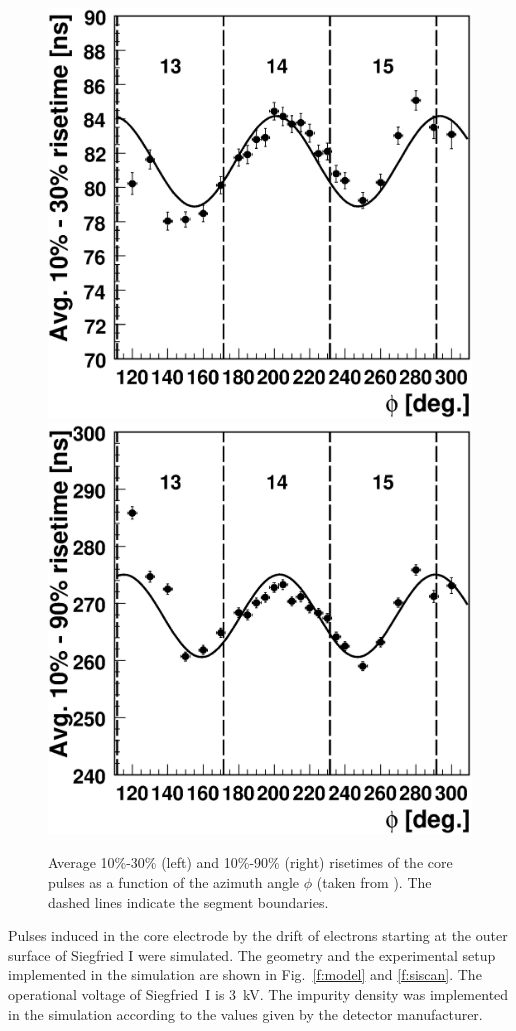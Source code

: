 \documentclass[epj]{svjour}
\begin{document}
\begin{figure}[htpb]
\centering
\includegraphics[width=0.7\linewidth]{phi_risetime1030}
\includegraphics[width=0.7\linewidth]{phi_risetime1090}
\caption{Average 10\%-30\% (left) and 10\%-90\% (right) risetimes of
the core pulses as a function of the azimuth angle $\phi$ (taken from
\cite{si}). The dashed lines indicate the segment boundaries.}
\label{f:rt10}
\end{figure}

Pulses induced in the core electrode by the drift of electrons
starting at the outer surface of Siegfried I were simulated. The
geometry and the experimental setup implemented in the simulation are
shown in Fig.~\ref{f:model} and \ref{f:siscan}. The operational
voltage of Siegfried~I is 3~kV. The impurity density was implemented
in the simulation according to the values given by the detector
manufacturer.
\end{document}
